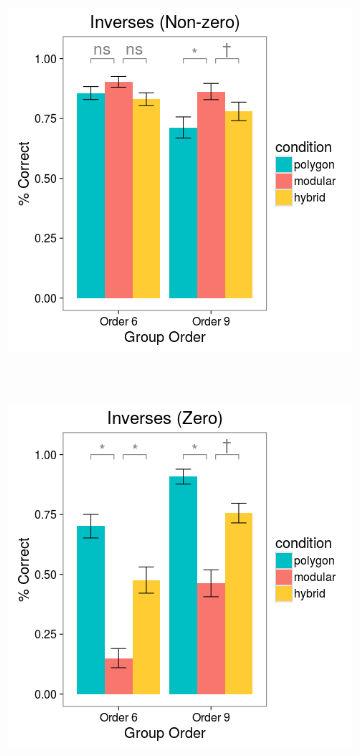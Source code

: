 \documentclass[man,mask,10pt]{apa6}
\begin{document}
\begin{figure}[H]
\centering
\begin{subfigure}[c]{0.3\textwidth}
\centering
\includegraphics[width=\textwidth]{figures/3/in_NZ_r.png}
\end{subfigure}
~
\begin{subfigure}[c]{0.3\textwidth}
\centering
\includegraphics[width=\textwidth]{figures/3/in_Z_r.png}

\end{subfigure}
\end{figure}
\end{document}
